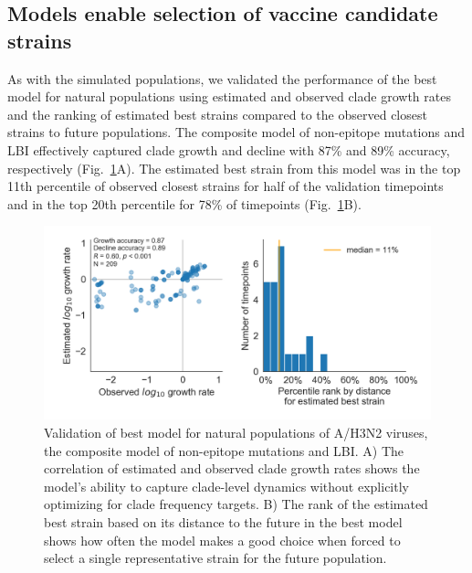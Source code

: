 \subsection*{Models enable selection of vaccine candidate strains}

As with the simulated populations, we validated the performance of the best model for natural populations using estimated and observed clade growth rates and the ranking of estimated best strains compared to the observed closest strains to future populations.
The composite model of non-epitope mutations and LBI effectively captured clade growth and decline with 87\% and 89\% accuracy, respectively (Fig.~\ref{fig:validation_of_best_model_for_natural_populations}A).
The estimated best strain from this model was in the top 11th percentile of observed closest strains for half of the validation timepoints and in the top 20th percentile for 78\% of timepoints (Fig.~\ref{fig:validation_of_best_model_for_natural_populations}B).

\begin{figure}[ht]
  \begin{center}
  \includegraphics[width=\textwidth]{figures/validation-of-best-model-for-natural-populations.png}
  \caption{
  Validation of best model for natural populations of A/H3N2 viruses, the composite model of non-epitope mutations and LBI.
  A) The correlation of estimated and observed clade growth rates shows the model's ability to capture clade-level dynamics without explicitly optimizing for clade frequency targets.
  B) The rank of the estimated best strain based on its distance to the future in the best model shows how often the model makes a good choice when forced to select a single representative strain for the future population.
  }
  \label{fig:validation_of_best_model_for_natural_populations}
  \end{center}
\end{figure}

